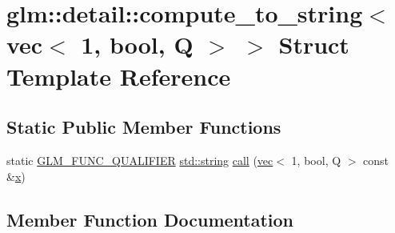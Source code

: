 \hypertarget{structglm_1_1detail_1_1compute__to__string_3_01vec_3_011_00_01bool_00_01_q_01_4_01_4}{}\section{glm\+:\+:detail\+:\+:compute\+\_\+to\+\_\+string$<$ vec$<$ 1, bool, Q $>$ $>$ Struct Template Reference}
\label{structglm_1_1detail_1_1compute__to__string_3_01vec_3_011_00_01bool_00_01_q_01_4_01_4}
\subsection*{Static Public Member Functions}
\begin{DoxyCompactItemize}
\item 
static \hyperlink{setup_8hpp_a33fdea6f91c5f834105f7415e2a64407}{G\+L\+M\+\_\+\+F\+U\+N\+C\+\_\+\+Q\+U\+A\+L\+I\+F\+I\+ER} \hyperlink{_s_d_l__opengl__glext_8h_ae84541b4f3d8e1ea24ec0f466a8c568b}{std\+::string} \hyperlink{structglm_1_1detail_1_1compute__to__string_3_01vec_3_011_00_01bool_00_01_q_01_4_01_4_ad6119763fcff0254a57ae8a51a9f5915}{call} (\hyperlink{structglm_1_1vec}{vec}$<$ 1, bool, Q $>$ const \&\hyperlink{_s_d_l__opengl_8h_ad0e63d0edcdbd3d79554076bf309fd47}{x})
\end{DoxyCompactItemize}


\subsection{Member Function Documentation}
\mbox{\label{structglm_1_1detail_1_1compute__to__string_3_01vec_3_011_00_01bool_00_01_q_01_4_01_4_ad6119763fcff0254a57ae8a51a9f5915}} 
